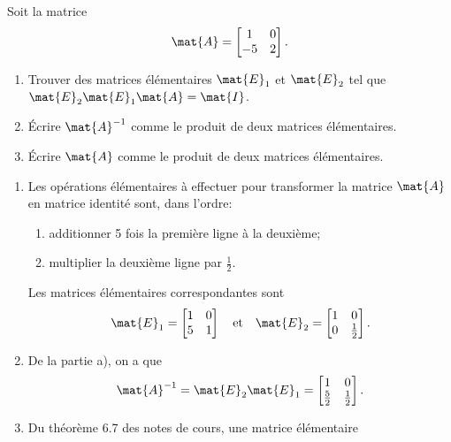 \begin{exercice}
  Soit la matrice
  \begin{displaymath}
    \mat{A} =
    \begin{bmatrix}
      1 & 0 \\ -5 & 2
    \end{bmatrix}.
  \end{displaymath}
  \begin{enumerate}
  \item Trouver des matrices élémentaires $\mat{E}_1$ et $\mat{E}_2$
    tel que $\mat{E}_2 \mat{E}_1 \mat{A} = \mat{I}$.
  \item Écrire $\mat{A}^{-1}$ comme le produit de deux matrices
    élémentaires.
  \item Écrire $\mat{A}$ comme le produit de deux matrices
    élémentaires.
  \end{enumerate}
  \begin{sol}
    \begin{enumerate}
    \item Les opérations élémentaires à effectuer pour transformer la
      matrice $\mat{A}$ en matrice identité sont, dans l'ordre:
      \begin{enumerate}[1.]
      \item additionner 5 fois la première ligne à la deuxième;
      \item multiplier la deuxième ligne par $\frac{1}{2}$.
      \end{enumerate}
      Les matrices élémentaires correspondantes sont
      \begin{displaymath}
        \mat{E}_1 =
        \begin{bmatrix} 1&0 \\ 5&1 \end{bmatrix} \quad
        \text{et} \quad
        \mat{E}_2 = \begin{bmatrix} 1&0 \\ 0&\frac{1}{2} \end{bmatrix}.
      \end{displaymath}
    \item De la partie a), on a que
      \begin{displaymath}
        \mat{A}^{-1} = \mat{E}_2 \mat{E}_1 =
        \begin{bmatrix} 1 & 0 \\ \frac{5}{2} & \frac{1}{2} \end{bmatrix}.
      \end{displaymath}
    \item Du théorème 6.7 des notes de cours, une matrice élémentaire

\end{enumerate}
\end{sol}
\end{exercice}

